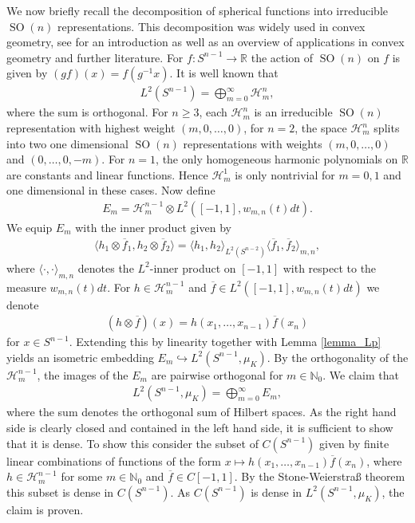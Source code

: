 \documentclass[12pt,twoside]{amsart}
\numberwithin{satz}{section}
\theoremstyle{definition}
\numberwithin{equation}{section}
\newcommand\R{\mathbb{R}}
\newcommand\N{\mathbb{N}}
\newcommand\SO{\operatorname{SO}}
\begin{document}
	We now briefly recall the decomposition of spherical functions into irreducible $\SO(n)$ representations. This decomposition was widely used in convex geometry, see \cite[Appendix]{schneider} for an introduction as well as an overview of applications in convex geometry and further literature. For $f:S^{n-1}\to \R$ the action of $\SO(n)$ on $f$ is given by $(gf)(x)=f(g^{-1}x)$. It is well known that
	\begin{align*}
		L^2(S^{n-1})=\bigoplus_{m=0}^\infty \mathcal{H}_m^n,
	\end{align*}
	where the sum is orthogonal. For $n\geq3$, each $\mathcal{H}_m^n$ is an irreducible $\SO(n)$ representation with highest weight $(m,0,\dots,0)$, for $n=2$, the space $\mathcal{H}^n_m$ splits into two one dimensional $\SO(n)$ representations with weights $(m,0,\dots,0)$ and $(0,\dots,0,-m)$. For $n=1$, the only homogeneous harmonic polynomials on $\R$ are constants and linear functions. Hence $\mathcal{H}_m^1$ is only nontrivial for $m=0,1$ and one dimensional in these cases. Now define
	\begin{align*}
		E_m=\mathcal{H}_m^{n-1}\otimes L^2\left([-1,1],w_{m,n}(t)dt\right).
	\end{align*}
	We equip $E_m$ with the inner product given by
	\begin{align*}
		\langle h_1\otimes \overline{f}_1,h_2\otimes \overline{f}_2\rangle = \langle h_1,h_2\rangle_{L^2(S^{n-2})} \langle \overline{f}_1,\overline{f}_2\rangle_{m,n},
	\end{align*}
	where $\langle\cdot,\cdot\rangle_{m,n}$ denotes the $L^2$-inner product on $[-1,1]$ with respect to the measure $w_{m,n}(t)dt$. For $h\in \mathcal{H}_m^{n-1}$ and $\overline{f}\in L^2\left([-1,1],w_{m,n}(t)dt\right)$ we denote 
	\begin{align*}
		(h\otimes \overline{f})(x)=h(x_1,\dots,x_{n-1})\overline{f}(x_n)
	\end{align*}
	for $x\in S^{n-1}$. Extending this by linearity together with Lemma \ref{lemma_Lp} yields an isometric embedding $E_m\hookrightarrow L^2(S^{n-1},\mu_K)$. By the orthogonality of the $\mathcal{H}_m^{n-1}$, the images of the $E_m$ are pairwise orthogonal for $m\in \N_0$. We claim that
	\begin{align}\label{direct_sum_L2}
		L^2(S^{n-1},\mu_K)=\bigoplus_{m=0}^\infty E_m,
	\end{align}
	where the sum denotes the orthogonal sum of Hilbert spaces. As the right hand side is clearly closed and contained in the left hand side, it is sufficient to show that it is dense. To show this consider the subset of $C(S^{n-1})$ given by finite linear combinations of functions of the form $x\mapsto h(x_1,\dots,x_{n-1})\overline{f}(x_n)$, where $h\in \mathcal{H}^{n-1}_m$ for some $m\in\N_0$ and $\overline{f}\in C[-1,1]$. By the Stone-Weierstraß theorem this subset is dense in $C(S^{n-1})$. As $C(S^{n-1})$ is dense in $L^2(S^{n-1},\mu_K)$, the claim is proven.
	
\end{document}
